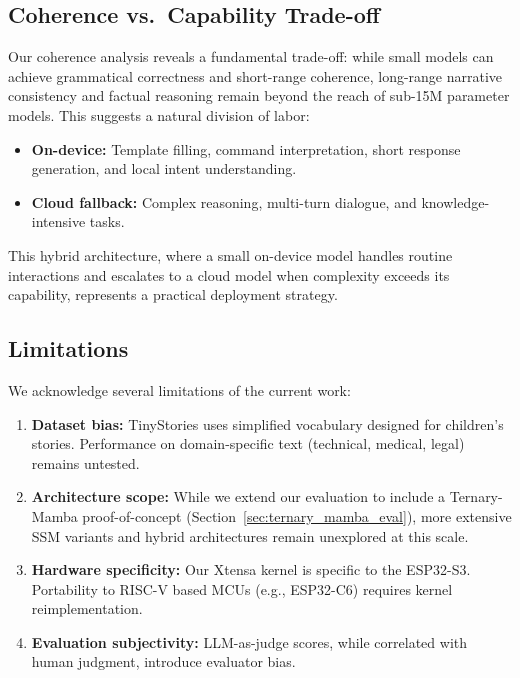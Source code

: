 \subsection{Coherence vs.\ Capability Trade-off}

Our coherence analysis reveals a fundamental trade-off: while small models
can achieve grammatical correctness and short-range coherence, long-range
narrative consistency and factual reasoning remain beyond the reach of
sub-15M parameter models. This suggests a natural division of labor:

\begin{itemize}[leftmargin=*,topsep=2pt,itemsep=1pt]
  \item \textbf{On-device:} Template filling, command interpretation,
        short response generation, and local intent understanding.
  \item \textbf{Cloud fallback:} Complex reasoning, multi-turn dialogue,
        and knowledge-intensive tasks.
\end{itemize}

This hybrid architecture, where a small on-device model handles routine
interactions and escalates to a cloud model when complexity exceeds its
capability, represents a practical deployment strategy.

\subsection{Limitations}

We acknowledge several limitations of the current work:

\begin{enumerate}[leftmargin=*,topsep=2pt,itemsep=1pt]
  \item \textbf{Dataset bias:} TinyStories uses simplified vocabulary
        designed for children's stories. Performance on domain-specific
        text (technical, medical, legal) remains untested.
  \item \textbf{Architecture scope:} While we extend our evaluation
        to include a Ternary-Mamba proof-of-concept (Section~\ref{sec:ternary_mamba_eval}),
        more extensive SSM variants and hybrid architectures
        remain unexplored at this scale.
  \item \textbf{Hardware specificity:} Our Xtensa kernel is specific to
        the ESP32-S3. Portability to RISC-V based MCUs (e.g., ESP32-C6)
        requires kernel reimplementation.
  \item \textbf{Evaluation subjectivity:} LLM-as-judge scores, while
        correlated with human judgment, introduce evaluator bias.
\end{enumerate}

